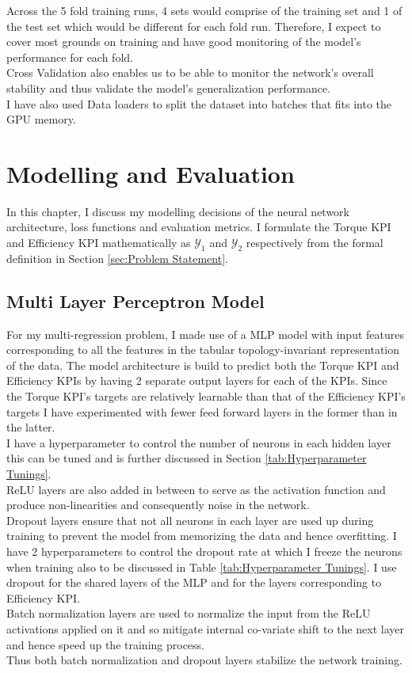 \documentclass{report} %
\begin{document}
Across the 5 fold training runs, 4 sets would comprise of the training set and 1 of the test set which would be different for each fold run.
Therefore, I expect to cover most grounds on training and have good monitoring of the model's performance for each fold.\\
Cross Validation also enables us to be able to monitor the network's overall stability and thus validate the model's generalization performance.\\
I have also used Data loaders to split the dataset into batches that fits into the \ac{GPU} memory.

\chapter{Modelling and Evaluation}
In this chapter, I discuss my modelling decisions of the neural network architecture, loss functions and evaluation metrics. I formulate the Torque \ac{KPI} and Efficiency 
\ac{KPI} mathematically as $\mathcal{Y}_1$ and $\mathcal{Y}_2$ respectively from the formal definition in Section \ref{sec:Problem Statement}.

\section{Multi Layer Perceptron Model}\label{sec:MLP Model}

For my multi-regression problem, I made use of a \ac{MLP} model with input features corresponding to all the features in the tabular topology-invariant representation of 
the data. The model architecture is build to predict both the Torque \ac{KPI} and Efficiency \ac{KPI}s by having 2 separate output layers for each of the \ac{KPI}s. 
Since the Torque \ac{KPI}'s targets are relatively learnable than that of the Efficiency \ac{KPI}'s targets I have experimented with fewer feed forward layers in the former than in the latter. \\
I have a hyperparameter to control the number of neurons in each hidden layer this can be tuned and is further discussed in Section \ref{tab:Hyperparameter Tunings}.\\
\ac{ReLU} layers are also added in between to serve as the activation function and produce non-linearities and consequently noise in the network. \\
Dropout layers ensure that not all neurons in each layer are used up during training to prevent the model from memorizing the data and hence overfitting.  
I have 2 hyperparameters to control the dropout rate at which I freeze the neurons when training also to be discussed in Table \ref{tab:Hyperparameter Tunings}.
I use dropout for the shared layers of the \ac{MLP} and for the layers corresponding to Efficiency \ac{KPI}.\\
Batch normalization layers are used to normalize the input from the \ac{ReLU} activations applied on it and so mitigate internal co-variate shift to the next layer and hence speed up the training process.\\
Thus both batch normalization and dropout layers stabilize the network training.\\
\end{document}
